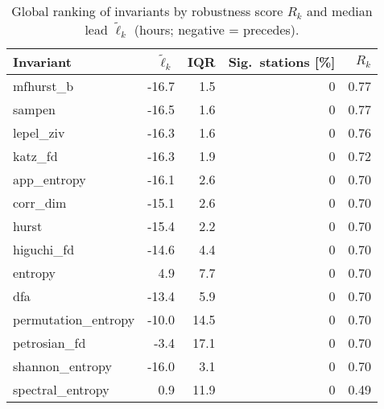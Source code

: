 
\begin{table}[t]
\centering
\small
\caption{Global ranking of invariants by robustness score $R_k$ and median lead $\widetilde{\ell}_k$ (hours; negative = precedes).}
\label{tab:rank_global}
\begin{tabular}{@{}l r r r r@{}}
\toprule
\textbf{Invariant} & $\widetilde{\ell}_k$ & IQR & Sig.\ stations [\%] & $R_k$ \\
\midrule
mfhurst\_b & -16.7 & 1.5 & 0 & 0.77 \\
sampen & -16.5 & 1.6 & 0 & 0.77 \\
lepel\_ziv & -16.3 & 1.6 & 0 & 0.76 \\
katz\_fd & -16.3 & 1.9 & 0 & 0.72 \\
app\_entropy & -16.1 & 2.6 & 0 & 0.70 \\
corr\_dim & -15.1 & 2.6 & 0 & 0.70 \\
hurst & -15.4 & 2.2 & 0 & 0.70 \\
higuchi\_fd & -14.6 & 4.4 & 0 & 0.70 \\
entropy & 4.9 & 7.7 & 0 & 0.70 \\
dfa & -13.4 & 5.9 & 0 & 0.70 \\
permutation\_entropy & -10.0 & 14.5 & 0 & 0.70 \\
petrosian\_fd & -3.4 & 17.1 & 0 & 0.70 \\
shannon\_entropy & -16.0 & 3.1 & 0 & 0.70 \\
spectral\_entropy & 0.9 & 11.9 & 0 & 0.49 \\
\bottomrule
\end{tabular}
\end{table}
